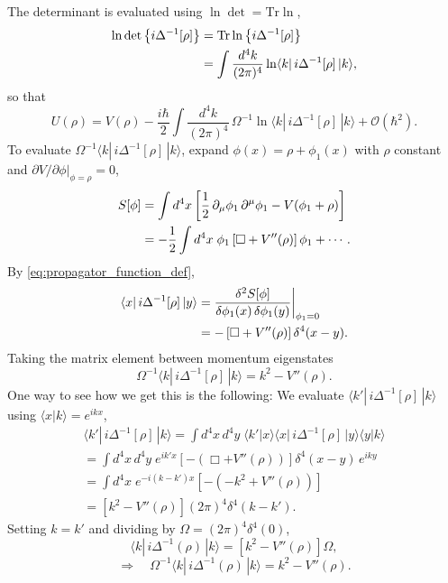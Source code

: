 The determinant is evaluated using $\ln\det = \mathrm{Tr}\ln$,
\begin{align}
	\ln\det\left\{i\Delta^{-1}[\rho]\right\}
	 & = \mathrm{Tr}\ln\left\{i\Delta^{-1}[\rho]\right\} \notag \\
	 & = \int\frac{d^4k}{(2\pi)^4}
	\ln\langle k|\,i\Delta^{-1}[\rho]\,|k\rangle,
\end{align}
so that
\begin{equation}
	U(\rho) = V(\rho)
	- \frac{i\hbar}{2}\int\frac{d^4k}{(2\pi)^4}\,
	\Omega^{-1}\ln\langle k|\,i\Delta^{-1}[\rho]\,|k\rangle
	+ \mathcal{O}(\hbar^2).
	\label{eq:U_10.41}
\end{equation}
To evaluate $\Omega^{-1}\langle k|\,i\Delta^{-1}[\rho]\,|k\rangle$, expand
$\phi(x) = \rho + \phi_1(x)$ with $\rho$ constant and
$\left.\partial V/\partial\phi\right|_{\phi=\rho}=0$,
\begin{align}
	S[\phi] & = \int d^4x\left[\frac{1}{2}\,\partial_\mu\phi_1\,
		                     \partial^\mu\phi_1 - V(\phi_1+\rho)\right] \notag \\
	        & = -\frac{1}{2}\int d^4x\;\phi_1
	\left[\Box + V''(\rho)\right]\phi_1 + \cdots.
\end{align}
By \eqref{eq:propagator_function_def},
\begin{align}
	\langle x|\,i\Delta^{-1}[\rho]\,|y\rangle
	 & = \frac{\delta^2 S[\phi]}{\delta\phi_1(x)\,\delta\phi_1(y)}
	\bigg|_{\phi_1=0} \notag                                       \\
	 & = -\left[\Box + V''(\rho)\right]\delta^4(x-y).
\end{align}
Taking the matrix element between momentum eigenstates
\begin{equation}
	\Omega^{-1}\langle k|\,i\Delta^{-1}[\rho]\,|k\rangle
	= k^2 - V''(\rho).
\end{equation}
One way to see how we get this is the following: 
We evaluate $\langle k'|\,i\Delta^{-1}[\rho]\,|k\rangle$ using
$\langle x|k\rangle = e^{ikx}$,
\begin{multline}
	\langle k'|\,i\Delta^{-1}[\rho]\,|k\rangle
	= \int d^4x\,d^4y\;\langle k'|x\rangle
	\langle x|\,i\Delta^{-1}[\rho]\,|y\rangle\langle y|k\rangle \\
	= \int d^4x\,d^4y\;e^{ik'x}
	\left[-\left(\Box+V''(\rho)\right)\right]
	\delta^4(x-y)\,e^{iky} \\
	= \int d^4x\;e^{-i(k-k')x}
	\left[-(- k^2+V''(\rho))\right] \\
	= \left[k^2-V''(\rho)\right](2\pi)^4\delta^4(k-k').
\end{multline}
Setting $k=k'$ and dividing by $\Omega = (2\pi)^4\delta^4(0)$,
\begin{equation}
	\langle k|\,i\Delta^{-1}(\rho)\,|k\rangle
	= \left[k^2-V''(\rho)\right]\Omega,
\end{equation}
\begin{equation}
	\Rightarrow\quad
	\Omega^{-1}\langle k|\,i\Delta^{-1}(\rho)\,|k\rangle
	= k^2-V''(\rho).
\end{equation}


